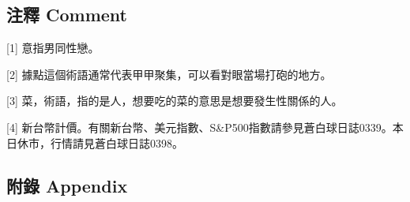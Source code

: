 \documentclass[
]{article}
\begin{document}
\hypertarget{ux6ce8ux91cb-comment-29}{%
\subsection{注釋 Comment}\label{ux6ce8ux91cb-comment-29}}

{[}1{]} 意指男同性戀。

{[}2{]} 據點這個術語通常代表甲甲聚集，可以看對眼當場打砲的地方。

{[}3{]} 菜，術語，指的是人，想要吃的菜的意思是想要發生性關係的人。

{[}4{]}
新台幣計價。有關新台幣、美元指數、S\&P500指數請參見蒼白球日誌0339。本日休市，行情請見蒼白球日誌0398。

\hypertarget{ux9644ux9304-appendix-29}{%
\subsection{附錄 Appendix}\label{ux9644ux9304-appendix-29}}
\end{document}

